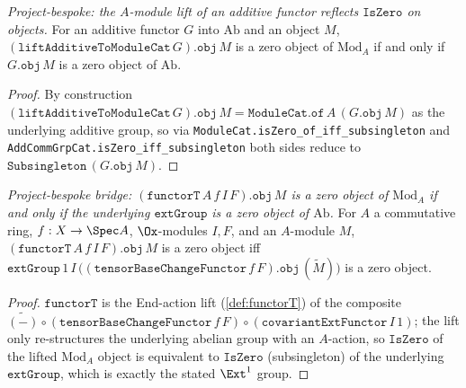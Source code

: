 \begin{lemma}
  \label{lem:liftAdditiveToModuleCat_isZero_obj_iff}
  \textit{Project-bespoke: the $A$-module lift of an additive functor reflects
  $\mathtt{IsZero}$ on objects.}
  For an additive functor $G$ into $\mathrm{Ab}$ and an object $M$,
  $(\mathtt{liftAdditiveToModuleCat}\,G).\mathtt{obj}\,M$ is a zero object of
  $\mathrm{Mod}_A$ if and only if $G.\mathtt{obj}\,M$ is a zero object of
  $\mathrm{Ab}$.
  \begin{proof}
    By construction $(\mathtt{liftAdditiveToModuleCat}\,G).\mathtt{obj}\,M =
    \mathtt{ModuleCat.of}\,A\,(G.\mathtt{obj}\,M)$ as the underlying additive
    group, so via \texttt{ModuleCat.isZero\_of\_iff\_subsingleton} and
    \texttt{AddCommGrpCat.isZero\_iff\_subsingleton} both sides reduce to
    $\mathtt{Subsingleton}\,(G.\mathtt{obj}\,M)$.
  \end{proof}
\end{lemma}

\begin{lemma}
  \label{lem:functorT_obj_isZero_iff}
  \textit{Project-bespoke bridge: $(\texttt{functorT}\,A\,f\,I\,F).\mathtt{obj}\,M$ is a zero
  object of $\mathrm{Mod}_A$ if and only if the underlying $\mathtt{extGroup}$ is a
  zero object of $\mathrm{Ab}$.}
  For $A$ a commutative ring, $f : X \to \Spec A$, $\Ox$-modules $I, F$, and an
  $A$-module $M$, $(\texttt{functorT}\,A\,f\,I\,F).\mathtt{obj}\,M$ is a zero object iff
  $\mathtt{extGroup}\,1\,I\,\big((\mathtt{tensorBaseChangeFunctor}\,f\,F).\mathtt{obj}\,(\widetilde M)\big)$
  is a zero object.
  \begin{proof}
    $\texttt{functorT}$ is the End-action lift (\cref{def:functorT}) of the composite
    $\widetilde{(-)} \circ (\mathtt{tensorBaseChangeFunctor}\,f\,F) \circ
    (\texttt{covariantExtFunctor}\,I\,1)$; the lift only re-structures the underlying
    abelian group with an $A$-action, so $\mathtt{IsZero}$ of the lifted
    $\mathrm{Mod}_A$ object is equivalent to $\mathtt{IsZero}$ (subsingleton) of the
    underlying $\mathtt{extGroup}$, which is exactly the stated $\Ext^1$ group.
  \end{proof}
\end{lemma}


